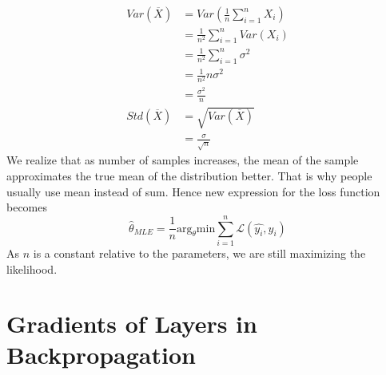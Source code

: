 \documentclass{article}
\numberwithin{equation}{subsection}
\begin{document}
\begin{align}
    Var(\overline{X}) &= Var(\frac{1}{n}\sum_{i=1}^{n} X_i)\\
    &= \frac{1}{n^2} \sum_{i=1}^{n} Var(X_i)\\
    &= \frac{1}{n^2} \sum_{i=1}^{n} \sigma^2\\
    &= \frac{1}{n^2} n \sigma^2\\
    &= \frac{\sigma^2}{n}\\
    Std(\overline{X}) &= \sqrt{Var(\overline{X})}\\
    &= \frac{\sigma}{\sqrt{n}}
\end{align}
We realize that as number of samples increases, the mean of the sample approximates the true mean of the distribution better. That is why people usually use mean instead of sum. Hence new expression for the loss function becomes 
\begin{equation}
    \hat{\theta}_{MLE} = \frac{1}{n}\text{arg}_\theta \text{min} \sum_{i=1}^n \mathcal{L}(\hat{y_i},y_i)
\end{equation}
As $n$ is a constant relative to the parameters, we are still maximizing the likelihood.
\section{Gradients of Layers in Backpropagation}
\end{document}
